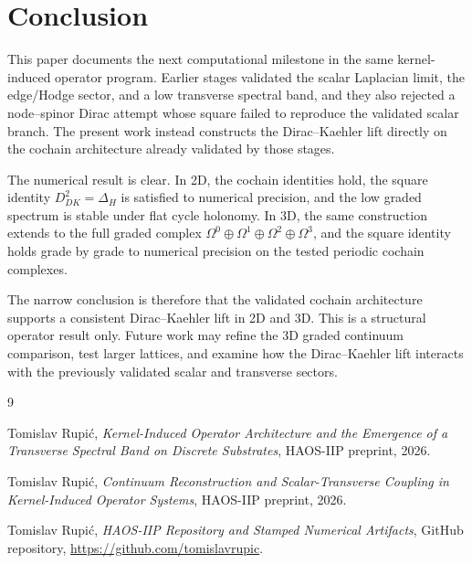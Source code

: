 \documentclass[11pt]{article}
\begin{document}
\section{Conclusion}
This paper documents the next computational milestone in the same kernel-induced operator program. Earlier stages validated the scalar Laplacian limit, the edge/Hodge sector, and a low transverse spectral band, and they also rejected a node--spinor Dirac attempt whose square failed to reproduce the validated scalar branch. The present work instead constructs the Dirac--Kaehler lift directly on the cochain architecture already validated by those stages.

The numerical result is clear. In 2D, the cochain identities hold, the square identity $D_{DK}^2 = \Delta_H$ is satisfied to numerical precision, and the low graded spectrum is stable under flat cycle holonomy. In 3D, the same construction extends to the full graded complex $\Omega^0 \oplus \Omega^1 \oplus \Omega^2 \oplus \Omega^3$, and the square identity holds grade by grade to numerical precision on the tested periodic cochain complexes.

The narrow conclusion is therefore that the validated cochain architecture supports a consistent Dirac--Kaehler lift in 2D and 3D. This is a structural operator result only. Future work may refine the 3D graded continuum comparison, test larger lattices, and examine how the Dirac--Kaehler lift interacts with the previously validated scalar and transverse sectors.

\begin{thebibliography}{9}

Tomislav Rupi\'c,
\newblock \emph{Kernel-Induced Operator Architecture and the Emergence of a Transverse Spectral Band on Discrete Substrates},
\newblock HAOS-IIP preprint, 2026.

Tomislav Rupi\'c,
\newblock \emph{Continuum Reconstruction and Scalar-Transverse Coupling in Kernel-Induced Operator Systems},
\newblock HAOS-IIP preprint, 2026.

Tomislav Rupi\'c,
\newblock \emph{HAOS-IIP Repository and Stamped Numerical Artifacts},
\newblock GitHub repository, \url{https://github.com/tomislavrupic}.

\end{thebibliography}
\end{document}
